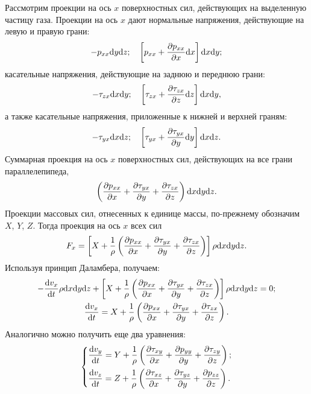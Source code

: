 	Рассмотрим проекции на ось $x$ поверхностных сил, действующих на выделенную частицу газа. Проекции на ось $x$ дают нормальные напряжения, действующие на левую и правую грани:
	\begin{gather*}
		-p_{xx}\mathrm{d} y\mathrm{d} z; \quad \left[p_{xx} + \frac{\partial p_{xx}}{\partial x}\mathrm{d} x\right]\mathrm{d} x\mathrm{d} y;
	\end{gather*}
	касательные напряжения, действующие на заднюю и переднюю грани:
	\begin{gather*}
		-\tau_{zx}\mathrm{d} x\mathrm{d} y; \quad \left[\tau_{zx} + \frac{\partial \tau_{zx}}{\partial z}\mathrm{d} z\right]\mathrm{d} x\mathrm{d} y,
	\end{gather*}
	а также касательные напряжения, приложенные к нижней и верхней граням:
	\begin{gather*}
		-\tau_{yx}\mathrm{d} x\mathrm{d} z; \quad \left[\tau_{yx} + \frac{\partial \tau_{yx}}{\partial y}\mathrm{d} y\right]\mathrm{d} x\mathrm{d} z.
	\end{gather*}\n
	Суммарная проекция на ось $x$ поверхностных сил, действующих на все грани параллелепипеда,
	\begin{gather*}
		\left(\frac{\partial p_{xx}}{\partial x} + \frac{\partial\tau_{yx}}{\partial y} + \frac{\partial\tau_{zx}}{\partial z}\right)\mathrm{d} x\mathrm{d} y\mathrm{d} z.
	\end{gather*}\n
	Проекции массовых сил, отнесенных к единице массы, по-прежнему обозначим $X$, $Y$, $Z$. Тогда проекция на ось $x$ всех сил
	\begin{gather*}
		F_x = \left[X + \frac{1}{\rho}\left(\frac{\partial p_{xx}}{\partial x} + \frac{\partial\tau_{yx}}{\partial y} + \frac{\partial\tau_{zx}}{\partial z}\right)\right]\rho\mathrm{d} x\mathrm{d} y\mathrm{d} z.
	\end{gather*}\n
	Используя принцип Даламбера, получаем:
	\begin{gather}
		-\frac{\mathrm{d} v_x}{\mathrm{d} t}\rho\mathrm{d} x\mathrm{d} y\mathrm{d} z + \left[X + \frac{1}{\rho}\left(\frac{\partial p_{xx}}{\partial x} + \frac{\partial\tau_{yx}}{\partial y} + \frac{\partial\tau_{zx}}{\partial z}\right)\right]\rho\mathrm{d} x\mathrm{d} y\mathrm{d} z = 0;\nonumber\\
		\frac{\mathrm{d} v_x}{\mathrm{d} t} = X + \frac{1}{\rho}\left(\frac{\partial p_{xx}}{\partial x} + \frac{\partial\tau_{yx}}{\partial y} + \frac{\partial\tau_{zx}}{\partial z}\right).\label{eq:314}
	\end{gather}\n
	Аналогично можно получить еще два уравнения:
	\begin{gather}
		\begin{dcases}\label{eq:315}
			\frac{\mathrm{d} v_y}{\mathrm{d} t} = Y + \frac{1}{\rho}\left(\frac{\partial \tau_{xy}}{\partial x} + \frac{\partial p_{yy}}{\partial y} + \frac{\partial\tau_{zy}}{\partial z}\right);\\
			\frac{\mathrm{d} v_z}{\mathrm{d} t} = Z + \frac{1}{\rho}\left(\frac{\partial \tau_{xz}}{\partial x} + \frac{\partial\tau_{yz}}{\partial y} + \frac{\partial p_{zz}}{\partial z}\right).
		\end{dcases}
	\end{gather}\n
